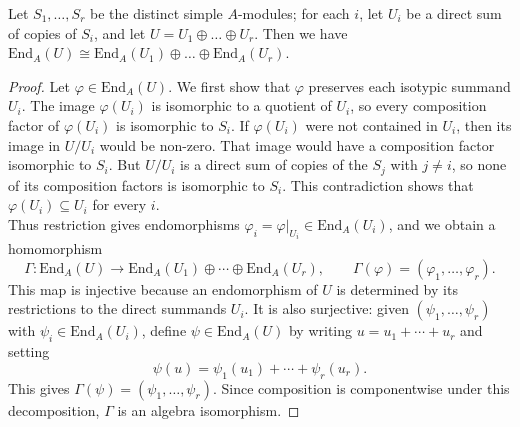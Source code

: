 \documentclass[../Odyssey_Project.tex]{subfiles}
\begin{document}
\begin{lemma}
\label{lem:13.12}
Let $S_1, \dots, S_r$ be the distinct simple $A$-modules; for each $i$, let $U_i$ be a direct sum of copies of $S_i$, and let $U = U_1 \oplus \dots \oplus U_r$. Then we have $\mathrm{End}_A(U) \cong \mathrm{End}_A(U_1) \oplus \dots \oplus \mathrm{End}_A(U_r)$.
\end{lemma}
\begin{proof}
    Let $\varphi \in \mathrm{End}_A(U)$. We first show that $\varphi$ preserves each isotypic summand $U_i$. The image $\varphi(U_i)$ is isomorphic to a quotient of $U_i$, so every composition factor of $\varphi(U_i)$ is isomorphic to $S_i$. If $\varphi(U_i)$ were not contained in $U_i$, then its image in $U/U_i$ would be non-zero. That image would have a composition factor isomorphic to $S_i$. But $U/U_i$ is a direct sum of copies of the $S_j$ with $j \neq i$, so none of its composition factors is isomorphic to $S_i$. This contradiction shows that $\varphi(U_i) \subseteq U_i$ for every $i$.\\
    Thus restriction gives endomorphisms $\varphi_i = \varphi|_{U_i} \in \mathrm{End}_A(U_i)$, and we obtain a homomorphism
    \[
        \Gamma \colon \mathrm{End}_A(U) \to \mathrm{End}_A(U_1) \oplus \cdots \oplus \mathrm{End}_A(U_r),
        \qquad
        \Gamma(\varphi) = (\varphi_1,\ldots,\varphi_r).
    \]
    This map is injective because an endomorphism of $U$ is determined by its restrictions to the direct summands $U_i$. It is also surjective: given $(\psi_1,\ldots,\psi_r)$ with $\psi_i \in \mathrm{End}_A(U_i)$, define $\psi \in \mathrm{End}_A(U)$ by writing $u = u_1 + \cdots + u_r$ and setting
    \[
        \psi(u) = \psi_1(u_1) + \cdots + \psi_r(u_r).
    \]
    This gives $\Gamma(\psi) = (\psi_1,\ldots,\psi_r)$. Since composition is componentwise under this decomposition, $\Gamma$ is an algebra isomorphism.
\end{proof}
\end{document}
